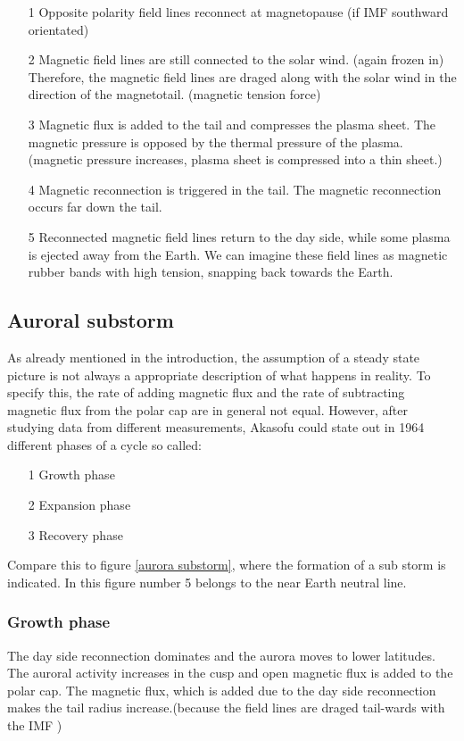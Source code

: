 \documentclass[10pt,a4paper]{article}
\begin{document}
\begin{itemize}
\item[1] Opposite polarity field lines reconnect at magnetopause (if IMF southward orientated)
\item[2] Magnetic field lines are still connected to the solar wind. (again frozen in) Therefore, the magnetic field lines are draged along with the solar wind in 
the direction of the magnetotail. (magnetic tension force)
\item[3] Magnetic flux is added to the tail and compresses the plasma sheet. The magnetic pressure is opposed by the thermal pressure of the plasma. 
(magnetic pressure increases, plasma sheet is compressed into a thin sheet.)
\item[4] Magnetic reconnection is triggered in the tail. The magnetic reconnection occurs far down the tail. 
\item[5] Reconnected magnetic field lines return to the day side, while some plasma is ejected away from the Earth. We can imagine these field lines as magnetic rubber bands with high tension, snapping back towards the Earth.
\end{itemize}

\subsection{Auroral substorm \label{_CHAP_THEO_substorm}}
As already mentioned in the introduction, the assumption of a steady state picture is not always a appropriate description of what happens in reality. To specify this, the rate of adding magnetic flux and the rate of subtracting magnetic flux from the polar cap are in general not equal. However, after studying data from different measurements, Akasofu could state out in 1964 different phases of a cycle so called:
\begin{itemize}
\item[1] Growth phase
\item[2] Expansion phase
\item[3] Recovery phase
\end{itemize}
Compare this to figure \ref{aurora substorm}, where the formation of a sub storm is indicated. In this figure number 5 belongs to the near Earth neutral line. 
\subsubsection{Growth phase}
The day side reconnection dominates and the aurora moves to lower latitudes. The auroral activity increases in the cusp and open magnetic flux is added to the polar cap.
The magnetic flux, which is added due to the day side reconnection makes the tail radius increase.(because the field lines are draged tail-wards with the IMF )
\end{document}

